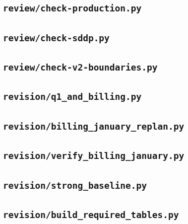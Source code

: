 \subsection*{\texttt{review/check-production.py}}


\subsection*{\texttt{review/check-sddp.py}}


\subsection*{\texttt{review/check-v2-boundaries.py}}


\subsection*{\texttt{revision/q1\_and\_billing.py}}


\subsection*{\texttt{revision/billing\_january\_replan.py}}


\subsection*{\texttt{revision/verify\_billing\_january.py}}


\subsection*{\texttt{revision/strong\_baseline.py}}


\subsection*{\texttt{revision/build\_required\_tables.py}}

